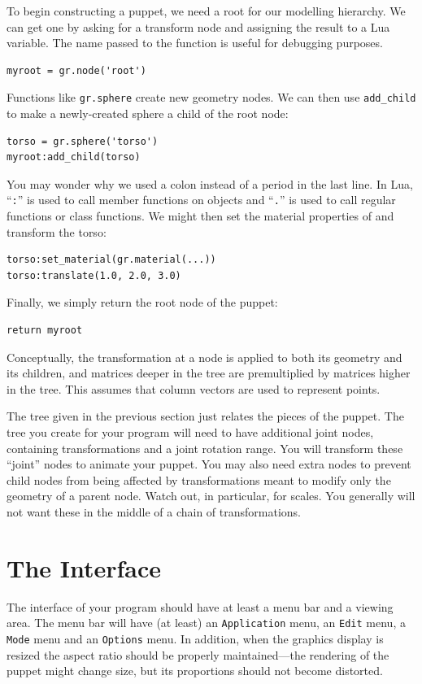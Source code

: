 To begin constructing a puppet, we need a root for our modelling hierarchy.
We can get one by asking for a transform node and assigning the result to
a Lua variable.  The name passed to the function is useful for debugging
purposes.
\begin{verbatim}
myroot = gr.node('root') 
\end{verbatim}
Functions like {\tt gr.sphere} create new geometry nodes.  We can then use
{\tt add\_child} to make a newly-created sphere a child of the root node:
\begin{verbatim}
torso = gr.sphere('torso') 
myroot:add_child(torso)
\end{verbatim}
You may wonder why we used a colon instead of a period in the last
line. In Lua, ``\texttt{:}'' is used to call member functions on
objects and ``\texttt{.}'' is used to call regular functions or class
functions.
We might then set the material properties of and transform the torso:
\begin{verbatim}
torso:set_material(gr.material(...))
torso:translate(1.0, 2.0, 3.0)
\end{verbatim}
Finally, we simply return the root node of the puppet:
\begin{verbatim}
return myroot
\end{verbatim}

Conceptually, the transformation at a node is applied to both its 
geometry and its children, and matrices deeper in the tree
are premultiplied by matrices higher in the tree.   This assumes
that column vectors are used to represent points.

The tree given in the previous section just relates the pieces of the
puppet.  The tree you create for your program will need to have
additional joint nodes, containing transformations and a joint
rotation range.  You will transform these ``joint'' nodes to animate
your puppet.  You may also need extra nodes to prevent child nodes
from being affected by transformations meant to modify only the
geometry of a parent node.  Watch out, in particular, for scales.  You
generally will not want these in the middle of a chain of
transformations.

\section{The Interface} 
The interface of your program should have at least a menu bar and a
viewing area.  The menu bar will have (at least) an {\tt Application}
menu, an {\tt Edit} menu, a {\tt Mode} menu and an {\tt Options} menu.
In addition, when the graphics display is resized the aspect ratio
should be properly maintained---the rendering of the puppet might
change size, but its proportions should not become distorted.


